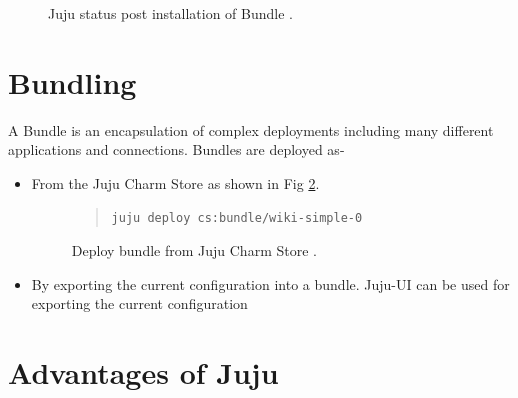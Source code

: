 \documentclass[9pt,twocolumn,twoside]{../../styles/osajnl}
\begin{document}
\begin{figure}[htbp]
\centering
{}
\caption{Juju status post installation of Bundle
  \cite{www-jujucharm-documentation}.}
\label{fig:juju-mediawiki-status}
\end{figure}

\section{Bundling}
A Bundle is an encapsulation of complex deployments including many
different applications and connections.
Bundles are deployed as-
\begin{itemize}
\item[1.] From the Juju Charm Store as shown in Fig
  \ref{fig:deploybundle-status}.
\begin{figure}
  \caption{Deploy bundle from Juju Charm Store
    \cite{www-jujucharm-documentation}.}
  \label{fig:deploybundle-status}
  \begin{quote}
    \begin{Verbatim}
juju deploy cs:bundle/wiki-simple-0
    \end{Verbatim}
  \end{quote}
\end{figure}
    
\item[2.] By exporting the current configuration into a
  bundle. Juju-UI can be used for exporting the current configuration
\end{itemize}

\section{Advantages of Juju}
\end{document}
